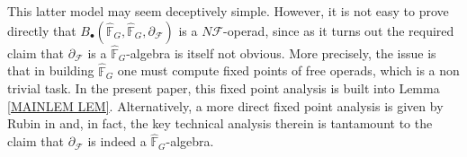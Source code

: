 \documentclass[a4paper,10pt]{article}%
\begin{document}
\begin{remark}
This latter model may seem deceptively simple. 
However, it is not easy to prove directly that
$B_{\bullet}(\widehat{\mathbb{F}}_G,
\widehat{\mathbb{F}}_G,
\partial_{\mathcal{F}})
$
is a $N \mathcal{F}$-operad,
since as it turns out the required claim that
$\partial_{\mathcal{F}}$ is a 
$\widehat{\mathbb{F}}_G$-algebra
is itself not obvious.
More precisely, the issue is that 
in building $\widehat{\mathbb{F}}_G$
one must compute fixed points of free operads, which is a non trivial task. 
In  the present paper, this fixed point analysis 
is built into Lemma \ref{MAINLEM LEM}.
Alternatively, a more direct fixed point analysis is given by Rubin in \cite{Rub17} and, in fact, the key technical analysis therein is tantamount to the claim that 
$\partial_{\mathcal{F}}$
is indeed a $\widehat{\mathbb{F}}_G$-algebra.
\end{remark}





  
\end{document}
